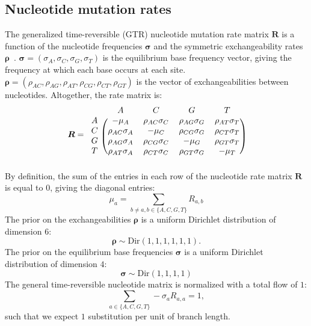 \documentclass{article}
\newcommand{\UniDimArray}[1]{\bm{#1}}
\newcommand{\BiDimArray}[1]{\bm{#1}}
\newcommand{\mutmatrix}{R}
\newcommand{\Mutmatrix}{\BiDimArray{\mutmatrix}}
\newcommand{\exchan}{\rho}
\newcommand{\Exchan}{\UniDimArray{\exchan}}
\newcommand{\mutequi}{\sigma}
\newcommand{\Mutequi}{\UniDimArray{\mutequi}}
\begin{document}
    \subsection{Nucleotide mutation rates}
    The generalized time-reversible (GTR) nucleotide mutation rate matrix $\Mutmatrix$ is a function of the nucleotide frequencies $\Mutequi$ and the symmetric exchangeability rates $\Exchan$~\cite{tavare_probabilistic_1986}.
    $\Mutequi = (\mutequi_A , \mutequi_C , \mutequi_G , \mutequi_T)$ is the equilibrium base frequency vector, giving the frequency at which each base occurs at each site.
    $\Exchan = \left( \exchan_{AC}, \exchan_{AG}, \exchan_{AT}, \exchan_{CG}, \exchan_{CT}, \exchan_{GT}\right)$ is the vector of exchangeabilities between nucleotides.
    Altogether, the rate matrix is:
    \begin{equation}
        \label{eq:gtr-mutrates}
        \Mutmatrix =
        \begin{blockarray}{ccccc}
            & A & C & G & T \\
            \begin{block}{c(cccc)}
                A & -\mu_A & {\exchan_{AC}\mutequi_C} & {\exchan_{AG}\mutequi_G} & {\exchan_{AT}\mutequi_T} \\
                C & {\exchan_{AC}\mutequi_A} &                        -\mu_C & {\exchan_{CG}\mutequi_G} & {\exchan_{CT}\mutequi_T} \\
                G & {\exchan_{AG}\mutequi_A} & {\exchan_{CG}\mutequi_C} &                        -\mu_G & {\exchan_{GT}\mutequi_T} \\
                T & {\exchan_{AT}\mutequi_A} & {\exchan_{CT}\mutequi_C} & {\exchan_{GT}\mutequi_G} & -\mu_T\\
            \end{block}
        \end{blockarray}
    \end{equation}
    By definition, the sum of the entries in each row of the nucleotide rate matrix $\Mutmatrix$ is equal to $0$, giving the diagonal entries:
    \begin{equation}
        \mu_a = \sum\limits_{ b \neq a, b \in \{A, C, G, T\} } \mutmatrix_{a,b}
    \end{equation}
    The {prior} on the exchangeabilities $\Exchan$ is a uniform Dirichlet distribution of dimension $6$:
    \begin{equation}
        \label{eq:DistribExchan}
        \Exchan \sim \text{Dir}\left( 1,1,1,1,1,1 \right).
    \end{equation}
    The {prior} on the equilibrium base frequencies $\Mutequi$ is a uniform Dirichlet distribution of dimension $4$:
    \begin{equation}
        \label{eq:DistribMutequi}
        \Mutequi \sim \text{Dir}\left( 1,1,1,1 \right)
    \end{equation}
    The general time-reversible nucleotide matrix is normalized with a total flow of $1$:
    \begin{equation}
        \sum\limits_{a \in \{A, C, G, T\}} - \mutequi_a \mutmatrix_{a,a} = 1,
    \end{equation}
    such that we expect $1$ {substitution} per unit of branch length.
\end{document}
